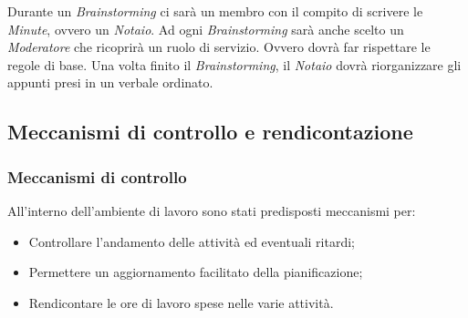 \documentclass[a4paper]{article}
\begin{document}
		Durante un \emph{Brainstorming} ci sarà un membro con il compito di scrivere le \emph{Minute}, ovvero un \emph{Notaio}.
		Ad ogni \emph{Brainstorming} sarà anche scelto un \emph{Moderatore} che ricoprirà un ruolo di servizio. Ovvero dovrà far
		rispettare le regole di base. Una volta finito il \emph{Brainstorming}, il \emph{Notaio} dovrà riorganizzare gli appunti
		presi in un verbale ordinato.
		
		\subsection{Meccanismi di controllo e rendicontazione}
		
			\subsubsection{Meccanismi di controllo}
				All'interno dell'ambiente di lavoro sono stati predisposti meccanismi per:
				\begin{itemize}
					\item Controllare l'andamento delle attività ed eventuali ritardi;
					\item Permettere un aggiornamento facilitato della pianificazione;
					\item Rendicontare le ore di lavoro spese nelle varie attività.
				\end{itemize}
				
\end{document}
